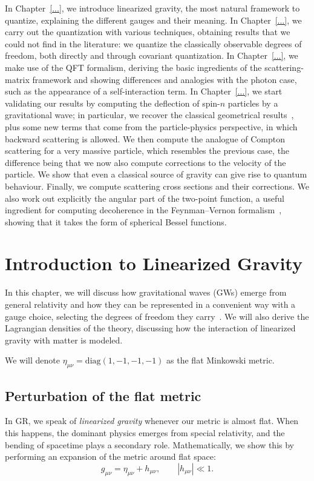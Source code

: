 \documentclass[12pt,a4paper,oneside]{article}
\numberwithin{equation}{section}   %
\begin{document}
In Chapter~\ref{...}, we introduce linearized gravity, the most natural
framework to quantize, explaining the different gauges and their meaning.
In Chapter~\ref{...}, we carry out the quantization with various techniques,
obtaining results that we could not find in the literature: we quantize the
classically observable degrees of freedom, both directly and through
covariant quantization.
In Chapter~\ref{...}, we make use of the QFT formalism, deriving the basic
ingredients of the scattering-matrix framework and showing differences and
analogies with the photon case, such as the appearance of a self-interaction
term.
In Chapter~\ref{...}, we start validating our results by computing the
deflection of spin-$n$ particles by a gravitational wave; in particular, we
recover the classical geometrical results~\cite{Peters1976}, plus some new terms that come
from the particle-physics perspective, in which backward scattering is
allowed.
We then compute the analogue of Compton scattering for a very massive
particle, which resembles the previous case, the difference being that we
now also compute corrections to the velocity of the particle. We show that
even a classical source of gravity can give rise to quantum behaviour.
Finally, we compute scattering cross sections and their corrections. We also
work out explicitly the angular part of the two-point function, a useful
ingredient for computing decoherence in the Feynman--Vernon formalism~\cite{CalzettaHu2008},
showing that it takes the form of spherical Bessel functions.
\newpage
\section{Introduction to Linearized Gravity}
In this chapter, we will discuss how gravitational waves (GWs) emerge from
general relativity and how they can be represented in a convenient way with a
gauge choice, selecting the degrees of freedom they carry~\cite{Maggiore2008,Weinberg1972}. We will also derive
the Lagrangian densities of the theory, discussing how the interaction of
linearized gravity with matter is modeled.

We will denote $\eta_{\mu\nu} = \text{diag}(1,-1,-1,-1)$ as the flat Minkowski metric.
\subsection{Perturbation of the flat metric}

In GR, we speak of \textit{linearized gravity} whenever our metric is almost flat. 
When this happens, the dominant physics emerges from special relativity, 
and the bending of spacetime plays a secondary role.
Mathematically, we show this by performing an expansion of the metric around flat space:
\begin{equation}
g_{\mu\nu} = \eta_{\mu\nu} + h_{\mu\nu}, \qquad |h_{\mu\nu}| \ll 1. \label{g}
\end{equation}
\end{document}
